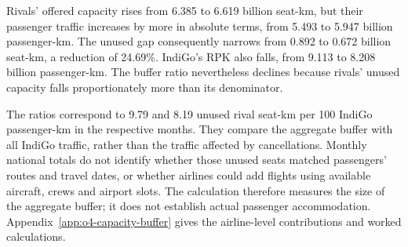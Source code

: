\documentclass[12pt,a4paper]{article}
\begin{document}
Rivals' offered capacity rises from 6.385 to 6.619 billion seat-km, but their passenger traffic increases by more in absolute terms, from 5.493 to 5.947 billion passenger-km. The unused gap consequently narrows from 0.892 to 0.672 billion seat-km, a reduction of 24.69\%. IndiGo's RPK also falls, from 9.113 to 8.208 billion passenger-km. The buffer ratio nevertheless declines because rivals' unused capacity falls proportionately more than its denominator.

The ratios correspond to 9.79 and 8.19 unused rival seat-km per 100 IndiGo passenger-km in the respective months. They compare the aggregate buffer with all IndiGo traffic, rather than the traffic affected by cancellations. Monthly national totals do not identify whether those unused seats matched passengers' routes and travel dates, or whether airlines could add flights using available aircraft, crews and airport slots. The calculation therefore measures the size of the aggregate buffer; it does not establish actual passenger accommodation. Appendix~\ref{app:o4-capacity-buffer} gives the airline-level contributions and worked calculations.


\clearpage
\end{document}
